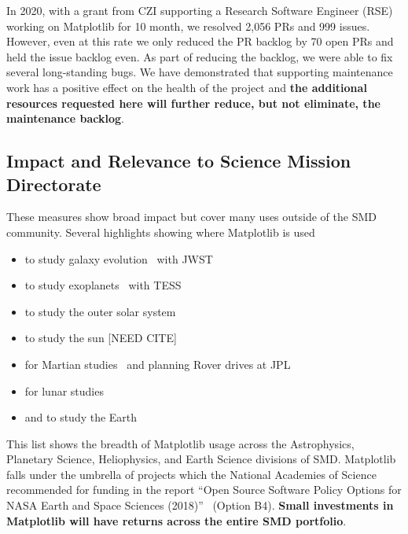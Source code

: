 \documentclass[12pt]{article}
\numberwithin{page}{section}
\begin{document}

In 2020, with a grant from CZI supporting a Research Software Engineer
(RSE) working on Matplotlib for 10 month, we resolved 2,056 PRs and
999 issues.  However, even at this rate we only reduced the PR backlog
by 70 open PRs and held the issue backlog even.  As part of reducing
the backlog, we were able to fix several long-standing bugs.  We have
demonstrated that supporting maintenance work has a positive effect on
the health of the project and \textbf{the additional resources
  requested here will further reduce, but not eliminate, the
  maintenance backlog}.


\subsection{Impact and Relevance to Science Mission Directorate}






These measures show broad impact but cover many uses outside of the
SMD community.  Several highlights showing where Matplotlib is used

\begin{itemize}[noitemsep]
\item to study galaxy evolution~\cite{2022ApJ...940L..14N} with JWST
\item to study exoplanets~\cite{2020AJ....160..116G, Barclay_2018,2019AJ....158...27L} with TESS
\item to study the outer solar system~\cite{Emran_2023}
\item to study the sun [NEED CITE]
\item for Martian studies~\cite{2022JE007697} and planning Rover drives at JPL~\cite{acurtis}
\item for lunar studies~\cite{NESNAS2023163}
\item and to study the Earth~\cite{paolo_2024}
\end{itemize}

This list shows the breadth of Matplotlib usage across the Astrophysics,
Planetary Science, Heliophysics, and Earth Science divisions of SMD.
Matplotlib falls under the umbrella of projects which the National Academies of
Science recommended for funding in the report ``Open Source Software Policy
Options for NASA Earth and Space Sciences (2018)''~\cite{NAP25217} (Option B4).
\textbf{Small investments in Matplotlib will have returns across the entire SMD
  portfolio}.
\end{document}

